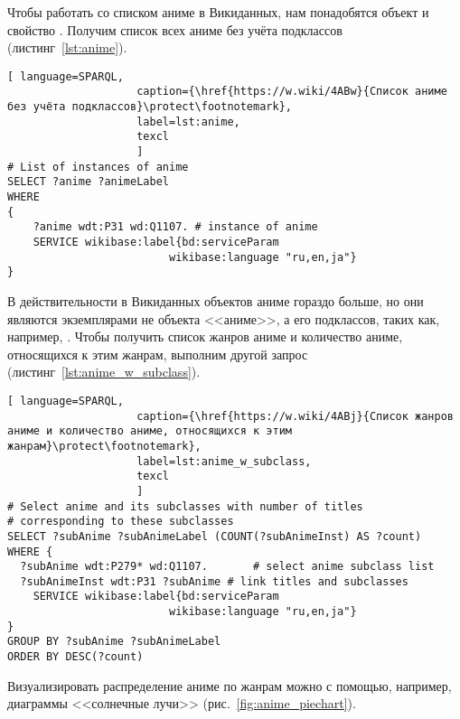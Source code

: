 Чтобы работать со списком аниме в Викиданных, нам понадобятся объект  и свойство . Получим список всех аниме без учёта подклассов (листинг~\ref{lst:anime}).

\newpage

\begin{lstlisting}[ language=SPARQL, 
                    caption={\href{https://w.wiki/4ABw}{Список аниме без учёта подклассов}\protect\footnotemark},
                    label=lst:anime,
                    texcl 
                    ]
# List of instances of anime
SELECT ?anime ?animeLabel
WHERE
{
    ?anime wdt:P31 wd:Q1107. # instance of anime
    SERVICE wikibase:label{bd:serviceParam
					     wikibase:language "ru,en,ja"}
}
\end{lstlisting}%

В действительности в Викиданных объектов аниме гораздо больше, но они являются экземплярами не объекта <<аниме>>, а его подклассов, таких как, например, . Чтобы получить список жанров аниме и количество аниме, относящихся к этим жанрам, выполним другой запрос (листинг~\ref{lst:anime_w_subclass}).

\begin{lstlisting}[ language=SPARQL, 
                    caption={\href{https://w.wiki/4ABj}{Список жанров аниме и количество аниме, относящихся к этим жанрам}\protect\footnotemark},
                    label=lst:anime_w_subclass,
                    texcl 
                    ]
# Select anime and its subclasses with number of titles
# corresponding to these subclasses
SELECT ?subAnime ?subAnimeLabel (COUNT(?subAnimeInst) AS ?count)
WHERE {
  ?subAnime wdt:P279* wd:Q1107.       # select anime subclass list
  ?subAnimeInst wdt:P31 ?subAnime # link titles and subclasses
    SERVICE wikibase:label{bd:serviceParam
					     wikibase:language "ru,en,ja"}
}
GROUP BY ?subAnime ?subAnimeLabel
ORDER BY DESC(?count)
\end{lstlisting}%

Визуализировать распределение аниме по жанрам можно с помощью, например, диаграммы <<солнечные лучи>> (рис.~\ref{fig:anime_piechart}).

